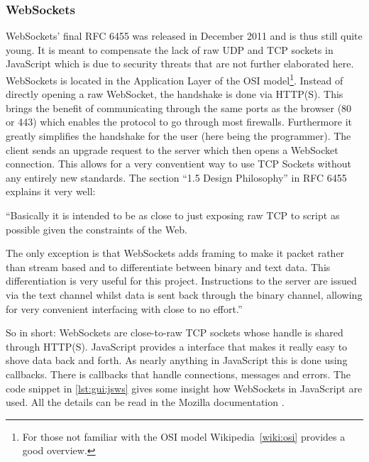 \subsubsection{WebSockets}
\label{subsec:gui:websockets}

WebSockets' final RFC 6455\cite{rfc:6455} was released in December 2011 and is thus still quite young. It is meant to compensate the lack of raw UDP and TCP sockets in JavaScript which is due to security threats that are not further elaborated here.
WebSockets is located in the Application Layer of the OSI model\footnote{For those not familiar with the OSI model Wikipedia~\ref{wiki:osi} provides a good overview.}.
Instead of directly opening a raw WebSocket, the handshake is done via HTTP(S). This brings the benefit of communicating through the same ports as the browser (80 or 443) which enables the protocol to go through most firewalls. Furthermore it greatly simplifies the handshake for the user (here being the programmer).
The client sends an upgrade request to the server which then opens a WebSocket connection.
This allows for a very conventient way to use TCP Sockets without any entirely new standards.
The section ``1.5 Design Philosophy'' in RFC 6455\cite{rfc:6455} explains it very well:

``Basically it is intended to be as close to just exposing raw TCP to script as possible given the constraints of the Web.

The only exception is that WebSockets adds framing to make it packet rather than stream based and to differentiate between binary and text data.
This differentiation is very useful for this project. Instructions to the server are issued via the text channel whilst data is sent back through the binary channel, allowing for very convenient interfacing with close to no effort.''

So in short: WebSockets are close-to-raw TCP sockets whose handle is shared through HTTP(S).
JavaScript provides a interface that makes it really easy to shove data back and forth.
As nearly anything in JavaScript this is done using callbacks. There is callbacks that handle connections, messages and errors. The code snippet in \ref{lst:gui:jsws} gives some insight how WebSockets in JavaScript are used. All the details can be read in the Mozilla documentation \cite{moz:ws}.


